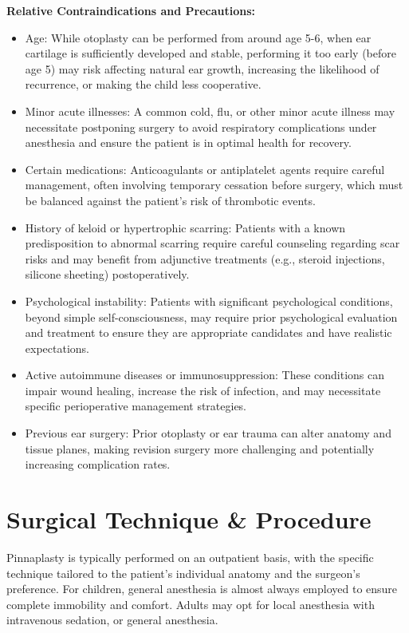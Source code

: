 \textbf{Relative Contraindications and Precautions:}
\begin{itemize}
  \item Age: While otoplasty can be performed from around age 5-6, when ear cartilage is sufficiently developed and stable, performing it too early (before age 5) may risk affecting natural ear growth, increasing the likelihood of recurrence, or making the child less cooperative.
  \item Minor acute illnesses: A common cold, flu, or other minor acute illness may necessitate postponing surgery to avoid respiratory complications under anesthesia and ensure the patient is in optimal health for recovery.
  \item Certain medications: Anticoagulants or antiplatelet agents require careful management, often involving temporary cessation before surgery, which must be balanced against the patient's risk of thrombotic events.
  \item History of keloid or hypertrophic scarring: Patients with a known predisposition to abnormal scarring require careful counseling regarding scar risks and may benefit from adjunctive treatments (e.g., steroid injections, silicone sheeting) postoperatively.
  \item Psychological instability: Patients with significant psychological conditions, beyond simple self-consciousness, may require prior psychological evaluation and treatment to ensure they are appropriate candidates and have realistic expectations.
  \item Active autoimmune diseases or immunosuppression: These conditions can impair wound healing, increase the risk of infection, and may necessitate specific perioperative management strategies.
  \item Previous ear surgery: Prior otoplasty or ear trauma can alter anatomy and tissue planes, making revision surgery more challenging and potentially increasing complication rates.
\end{itemize}

\section*{Surgical Technique \& Procedure}
Pinnaplasty is typically performed on an outpatient basis, with the specific technique tailored to the patient's individual anatomy and the surgeon's preference. For children, general anesthesia is almost always employed to ensure complete immobility and comfort. Adults may opt for local anesthesia with intravenous sedation, or general anesthesia.

